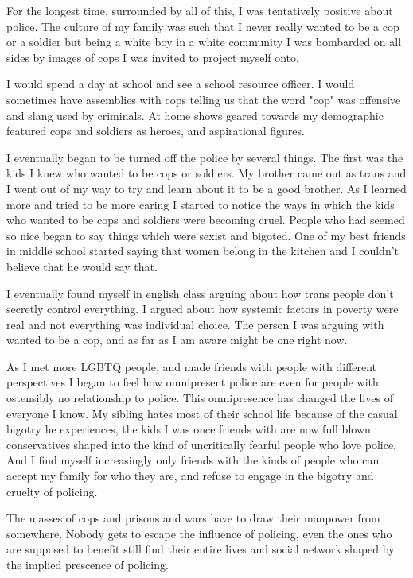\documentclass{report}
\begin{document}
For the longest time, surrounded by all of this, I was
tentatively positive about police. The culture of my family
was such that I never really wanted to be a cop or a soldier
but being a white boy in a white community I was bombarded
on all sides by images of cops I was invited to project
myself onto. 

I would spend a day at school and see a school resource
officer. I would sometimes have assemblies with cops
telling us that the word "cop" was offensive and slang used
by criminals. At home shows geared towards my demographic
featured cops and soldiers as heroes, and aspirational figures.

I eventually began to be turned off the police by several
things. The first was the kids I knew who wanted to be cops or
soldiers. My brother came out as trans and I went out of my
way to try and learn about it to be a good brother. As I 
learned more and tried to be more caring I started to notice 
the ways in which the kids who wanted to be cops and soldiers 
were becoming cruel. People who had seemed so nice began to say
things which were sexist and bigoted. One of my best friends in
middle school started saying that women belong in the kitchen
and I couldn't believe that he would say that. 

I eventually found myself in english class arguing about how
trans people don't secretly control everything. I argued about
how systemic factors in poverty were real and not everything
was individual choice. The person I was arguing with wanted
to be a cop, and as far as I am aware might be one right now.

As I met more LGBTQ people, and made friends with people
with different perspectives I began to feel how omnipresent
police are even for people with ostensibly no relationship to
police. This omnipresence has changed the lives of everyone I
know. My sibling hates most of their school life because of the
casual bigotry he experiences, the kids I was once friends with
are now full blown conservatives shaped into the kind of 
uncritically fearful people who love police. And I find myself
increasingly only friends with the kinds of people who can
accept my family for who they are, and refuse to engage in the
bigotry and cruelty of policing. 

The masses of cops and prisons and wars have to draw their
manpower from somewhere. Nobody gets to escape the influence
of policing, even the ones who are supposed to benefit
still find their entire lives and social network shaped by
the implied prescence of policing. 
\end{document}
